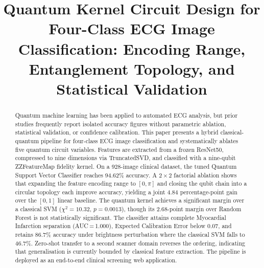 \documentclass[10pt,conference]{IEEEtran}
\begin{document}
\title{Quantum Kernel Circuit Design for Four-Class ECG Image
Classification: Encoding Range, Entanglement Topology,
and Statistical Validation}

\author{%
\and
{}
}

\maketitle

\begin{abstract}
Quantum machine learning has been applied to automated ECG analysis, but
prior studies frequently report isolated accuracy figures without
parametric ablation, statistical validation, or confidence calibration.
This paper presents a hybrid classical-quantum pipeline for four-class
ECG image classification and systematically ablates five quantum circuit
variables. Features are extracted from a frozen ResNet50, compressed to
nine dimensions via TruncatedSVD, and classified with a nine-qubit
ZZFeatureMap fidelity kernel. On a 928-image clinical dataset, the
tuned Quantum Support Vector Classifier reaches 94.62\% accuracy. A
$2\!\times\!2$ factorial ablation shows that expanding the feature
encoding range to $[0,\pi]$ and closing the qubit chain into a circular
topology each improve accuracy, yielding a joint 4.84 percentage-point
gain over the $[0,1]$ linear baseline. The quantum kernel achieves a
significant margin over a classical SVM ($\chi^{2}=10.32$, $p=0.0013$),
though its 2.68-point margin over Random Forest is not statistically
significant. The classifier attains complete Myocardial Infarction
separation (AUC\,=\,1.000), Expected Calibration Error below 0.07, and
retains 86.7\% accuracy under brightness perturbation where the
classical SVM falls to 46.7\%. Zero-shot transfer to a second scanner
domain reverses the ordering, indicating that generalisation is
currently bounded by classical feature extraction. The pipeline is
deployed as an end-to-end clinical screening web application.
\end{abstract}
\end{document}
